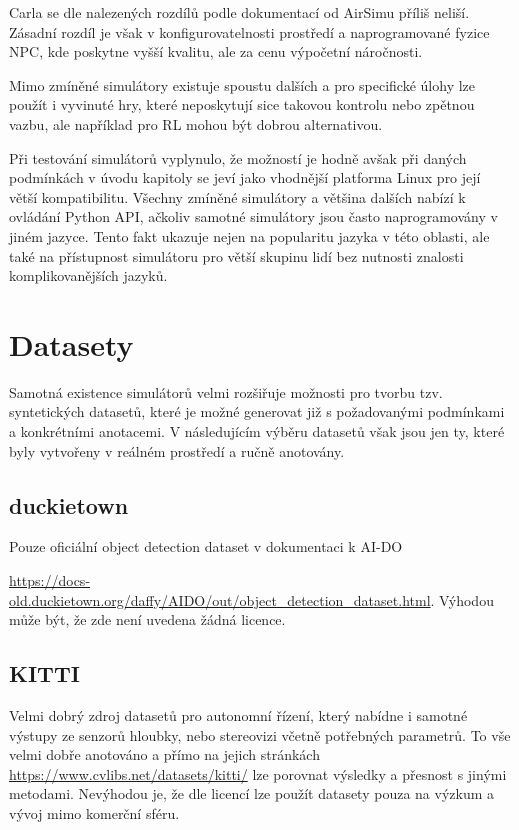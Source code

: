 \documentclass[czech, bc, kky, he, iso690alph]{fasthesis}
\begin{document}
	    		Carla se dle nalezených rozdílů podle dokumentací od AirSimu příliš neliší. Zásadní rozdíl je však v konfigurovatelnosti prostředí a naprogramované fyzice NPC, kde poskytne vyšší kvalitu, ale za cenu výpočetní náročnosti.
	    		
	    		Mimo zmíněné simulátory existuje spoustu dalších a pro specifické úlohy lze použít i vyvinuté hry, které neposkytují sice takovou kontrolu nebo zpětnou vazbu, ale například pro RL mohou být dobrou alternativou.
	    		
	    		Při testování simulátorů vyplynulo, že možností je hodně avšak při daných podmínkách v úvodu kapitoly se jeví jako vhodnější platforma Linux pro její větší kompatibilitu. Všechny zmíněné simulátory a většina dalších nabízí k ovládání Python API, ačkoliv samotné simulátory jsou často naprogramovány v jiném jazyce. Tento fakt ukazuje nejen na popularitu jazyka v této oblasti, ale také na přístupnost simulátoru pro větší skupinu lidí bez nutnosti znalosti komplikovanějších jazyků.
	    		
    	\section{Datasety}
    		Samotná existence simulátorů velmi rozšiřuje možnosti pro tvorbu tzv. syntetických datasetů, které je možné generovat již s požadovanými podmínkami a konkrétními anotacemi. V následujícím výběru datasetů však jsou jen ty, které byly vytvořeny v reálném prostředí a ručně anotovány.
    		\subsection{duckietown}
    			Pouze oficiální object detection dataset v dokumentaci k AI-DO 
    			
    			\href{https://docs-old.duckietown.org/daffy/AIDO/out/object_detection_dataset.html}{https://docs-old.duckietown.org/daffy/AIDO/out/object\_detection\_dataset.html}. Výhodou může být, že zde není uvedena žádná licence.
    		\subsection{KITTI}
    			Velmi dobrý zdroj datasetů pro autonomní řízení, který nabídne i samotné výstupy ze senzorů hloubky, nebo stereovizi včetně potřebných parametrů. To vše velmi dobře anotováno a přímo na jejich stránkách \href{https://www.cvlibs.net/datasets/kitti/}{https://www.cvlibs.net/datasets/kitti/} lze porovnat výsledky a přesnost s jinými metodami. Nevýhodou je, že dle licencí lze použít datasety pouza na výzkum a vývoj mimo komerční sféru.
\end{document}
